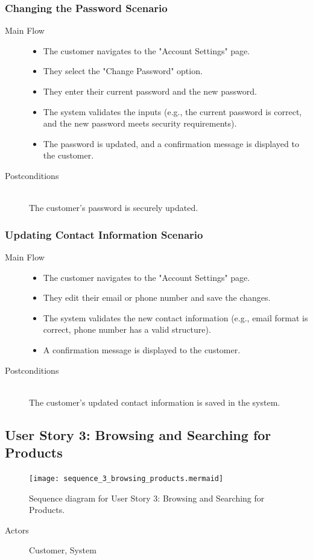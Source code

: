 \documentclass[twoside,a4paper,journal]{IEEEtran}
\begin{document}
\subsubsection{Changing the Password Scenario}
\begin{description}
  \item[Main Flow] \hfill
  \begin{itemize}
    \item The customer navigates to the "Account Settings" page.
    \item They select the "Change Password" option.
    \item They enter their current password and the new password.
    \item The system validates the inputs (e.g., the current password is
      correct, and the new password meets security requirements).
    \item The password is updated, and a confirmation message is displayed to
      the customer.
  \end{itemize}
  \item[Postconditions] \hfill \\
    The customer's password is securely updated.
\end{description}
\subsubsection{Updating Contact Information Scenario}
\begin{description}
  \item[Main Flow] \hfill
    \begin{itemize}
      \item The customer navigates to the "Account Settings" page.
      \item They edit their email or phone number and save the changes.
      \item The system validates the new contact information (e.g., email format
        is correct, phone number has a valid structure).
      \item A confirmation message is displayed to the customer.
    \end{itemize}
  \item[Postconditions] \hfill \\
    The customer's updated contact information is saved in the system.
\end{description}
\subsection{User Story 3: Browsing and Searching for Products}
\begin{figure}[!t]
\centering
\texttt{[image: sequence\_3\_browsing\_products.mermaid]}
\caption{Sequence diagram for User Story 3: Browsing and Searching for Products.}
\label{fig:sequence_3}
\end{figure}
\begin{description}
  \item[Actors] Customer, System
\end{description}
\end{document}
